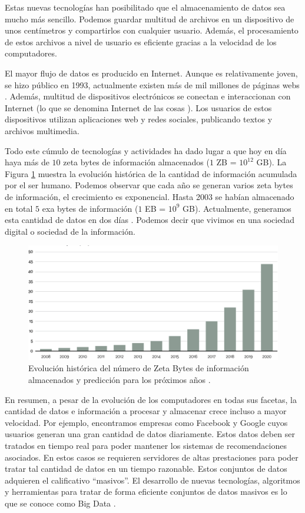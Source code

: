 \documentclass[10pt]{article}
\begin{document}
	Estas nuevas tecnologías han posibilitado que el almacenamiento de datos sea mucho más sencillo. Podemos guardar multitud de archivos en un dispositivo de unos centímetros y compartirlos con cualquier usuario. Además, el procesamiento de estos archivos a nivel de usuario es eficiente gracias a la velocidad de los computadores. 
	
	El mayor flujo de datos es producido en Internet. Aunque es relativamente joven, se hizo público en 1993, actualmente existen más de mil millones de páginas webs \cite{internet}. Además, multitud de dispositivos electrónicos se conectan e interaccionan con Internet (lo que se denomina Internet de las cosas \cite{big-data-internet-cosas}). Los usuarios de estos dispositivos utilizan aplicaciones web y redes sociales, publicando textos y archivos multimedia. 
	
	Todo este cúmulo de tecnologías y actividades ha dado lugar a que hoy en día haya más de $10$ zeta bytes de información almacenados ($1$ ZB = $10^{12}$ GB). La Figura \ref{fig:zeta-bytes} muestra la evolución histórica de la cantidad de información acumulada por el ser humano. Podemos observar que cada año se generan varios zeta bytes de información, el crecimiento es exponencial. Hasta 2003 se habían almacenado en total $5$ exa bytes de información ($1$ EB = $10^9$ GB). Actualmente, generamos esta cantidad de datos en dos días \cite{big-data}. Podemos decir que vivimos en una sociedad digital o sociedad de la información.

	\begin{figure}[H]
	       	\centering
	       	\includegraphics[width=14cm]{./images/Data.png}
	       	\caption{Evolución histórica del número de Zeta Bytes de información almacenados y predicción para los próximos años \cite{zeta-bytes}.} 
	       	\label{fig:zeta-bytes}
	 \end{figure}

	En resumen, a pesar de la evolución de los computadores en todas sus facetas, la cantidad de datos e información a procesar y almacenar crece incluso a mayor velocidad. Por ejemplo, encontramos empresas como Facebook y Google cuyos usuarios generan una gran cantidad de datos diariamente. Estos datos deben ser tratados en tiempo real para poder mantener los sistemas de recomendaciones asociados. En estos casos se requieren servidores de altas prestaciones para poder tratar tal cantidad de datos en un tiempo razonable. Estos conjuntos de datos adquieren el calificativo ``masivos''. El desarrollo de nuevas tecnologías, algoritmos y herramientas para tratar de forma eficiente conjuntos de datos masivos es lo que se conoce como Big Data \cite{big-data-herrera}.
	
\end{document}
